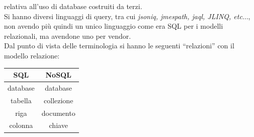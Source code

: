 \documentclass[a4paper,12pt, oneside]{book}
\begin{document}
relativa all'uso di database costruiti da terzi.\\
Si hanno diversi linguaggi di query, tra cui \textit{jsoniq, jmespath, jaql,
  JLINQ, etc$\ldots$}, non avendo più quindi un unico linguaggio come era SQL per i
modelli relazionali, ma avendone uno per vendor.\\
Dal punto di vista delle terminologia si hanno le seguenti ``relazioni'' con il
modello relazione:
\begin{table}[H]
  \centering
  \begin{tabular}{c|c}
    SQL & NoSQL\\
    \hline
    database & database \\
    tabella & collezione\\
    riga & documento\\
    colonna & chiave
  \end{tabular}
\end{table}
\end{document}
